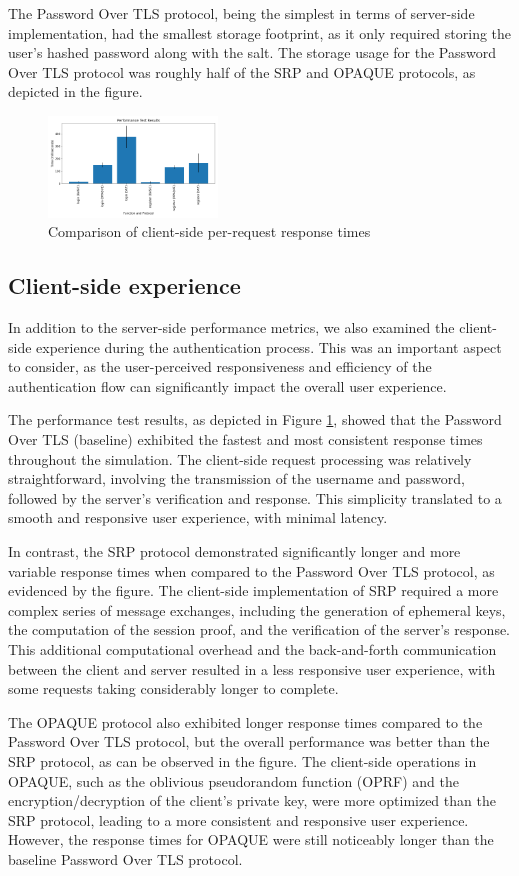 The Password Over TLS protocol, being the simplest in terms of server-side implementation, had the smallest storage footprint, as it only required storing the user's hashed password along with the salt. The storage usage for the Password Over TLS protocol was roughly half of the SRP and OPAQUE protocols, as depicted in the figure.

\begin{figure}[ht]
  \centering
  \includegraphics[width=0.4\textwidth]{./images/performance_test.png}
  \caption{Comparison of client-side per-request response times}
  \label{fig:performance_test}
\end{figure}

\subsection{Client-side experience}

In addition to the server-side performance metrics, we also examined the client-side experience during the authentication process. This was an important aspect to consider, as the user-perceived responsiveness and efficiency of the authentication flow can significantly impact the overall user experience.

The performance test results, as depicted in Figure \ref{fig:performance_test}, showed that the Password Over TLS (baseline) exhibited the fastest and most consistent response times throughout the simulation. The client-side request processing was relatively straightforward, involving the transmission of the username and password, followed by the server's verification and response. This simplicity translated to a smooth and responsive user experience, with minimal latency.

In contrast, the SRP protocol demonstrated significantly longer and more variable response times when compared to the Password Over TLS protocol, as evidenced by the figure. The client-side implementation of SRP required a more complex series of message exchanges, including the generation of ephemeral keys, the computation of the session proof, and the verification of the server's response. This additional computational overhead and the back-and-forth communication between the client and server resulted in a less responsive user experience, with some requests taking considerably longer to complete.

The OPAQUE protocol also exhibited longer response times compared to the Password Over TLS protocol, but the overall performance was better than the SRP protocol, as can be observed in the figure. The client-side operations in OPAQUE, such as the oblivious pseudorandom function (OPRF) and the encryption/decryption of the client's private key, were more optimized than the SRP protocol, leading to a more consistent and responsive user experience. However, the response times for OPAQUE were still noticeably longer than the baseline Password Over TLS protocol.